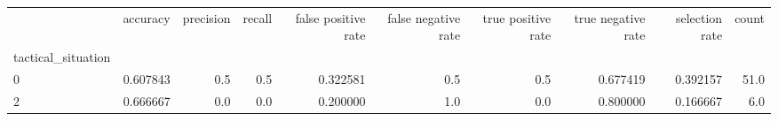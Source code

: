 \begin{tabular}{lrrrrrrrrr}
\toprule
{} &  accuracy &  precision &  recall &  false positive rate &  false negative rate &  true positive rate &  true negative rate &  selection rate &  count \\
tactical\_situation &           &            &         &                      &                      &                     &                     &                 &        \\
\midrule
0                  &  0.607843 &        0.5 &     0.5 &             0.322581 &                  0.5 &                 0.5 &            0.677419 &        0.392157 &   51.0 \\
2                  &  0.666667 &        0.0 &     0.0 &             0.200000 &                  1.0 &                 0.0 &            0.800000 &        0.166667 &    6.0 \\
\bottomrule
\end{tabular}
